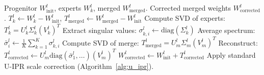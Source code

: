 \documentclass{article}
\begin{document}
\begin{algorithm}[H]
\caption{Spectral Parameter Resonance (S-IPR)}
\label{alg:s_ipr}
\begin{algorithmic}[1]
\REQUIRE Progenitor $W_{\text{init}}^l$, experts $W_k^l$, merged $W_{\text{merged}}^l$.
\ENSURE Corrected merged weights $W_{\text{corrected}}^l$.
    \STATE $T_k^l \leftarrow W_k^l - W_{\text{init}}^l$, $T_{\text{merged}}^l \leftarrow W_{\text{merged}}^l - W_{\text{init}}^l$
        \STATE Compute SVD of experts: $T_k^l = U_k^l \Sigma_k^l (V_k^l)^T$
        \STATE Extract singular values: $\sigma_{k, i}^l \leftarrow \text{diag}(\Sigma_k^l)$
        \STATE Average spectrum: $\bar{\sigma}_i^l \leftarrow \frac{1}{K} \sum_{k=1}^K \sigma_{k, i}^l$
        \STATE Compute SVD of merge: $T_{\text{merged}}^l = U_m^l \Sigma_m^l (V_m^l)^T$
        \STATE Reconstruct: $T_{\text{corrected}}^l \leftarrow U_m^l \text{diag}(\bar{\sigma}_1^l, \dots) (V_m^l)^T$
        \STATE $W_{\text{corrected}}^l \leftarrow W_{\text{init}}^l + T_{\text{corrected}}^l$
    \ELSE
        \STATE Apply standard U-IPR scale correction (Algorithm~\ref{alg:u_ipr}).
    \ENDIF
\ENDFOR
\end{algorithmic}
\end{algorithm}
\end{document}
